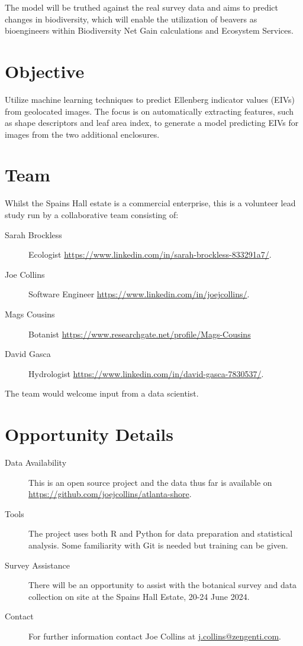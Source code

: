 \documentclass{./roles}
\begin{document}
The model will be truthed against the real survey data and aims to predict changes in biodiversity,
which will enable the utilization of beavers as bioengineers within Biodiversity Net Gain calculations and Ecosystem Services. 

\section*{Objective}

Utilize machine learning techniques to predict Ellenberg indicator values (EIVs)
from geolocated images.
The focus is on automatically extracting features,
such as shape descriptors and leaf area index,
to generate a model predicting EIVs for images from the two additional enclosures.

\section*{Team}

Whilst the Spains Hall estate is a commercial enterprise,
this is a volunteer lead study
run by a collaborative team consisting of:

\begin{description}
    \item[Sarah Brockless] Ecologist \href{https://www.linkedin.com/in/sarah-brockless-833291a7/}{https://www.linkedin.com/in/sarah-brockless-833291a7/}.
    \item[Joe Collins] Software Engineer \href{https://www.linkedin.com/in/joejcollins/}{https://www.linkedin.com/in/joejcollins/}.
    \item[Mags Cousins] Botanist \href{https://www.researchgate.net/profile/Mags-Cousins}{https://www.researchgate.net/profile/Mags-Cousins}
    \item[David Gasca] Hydrologist \href{https://www.linkedin.com/in/david-gasca-7830537/}{https://www.linkedin.com/in/david-gasca-7830537/}.
\end{description}

The team would welcome input from a data scientist.

\section*{Opportunity Details}

\begin{description}
    \item[Data Availability] This is an open source project and
        the data thus far is available on \href{https://github.com/joejcollins/atlanta-shore}{https://github.com/joejcollins/atlanta-shore}.
    \item[Tools] The project uses both R and Python for data preparation and statistical analysis.
        Some familiarity with Git is needed but training can be given.
    \item[Survey Assistance] There will be an opportunity to assist with the botanical survey
        and data collection on site at the Spains Hall Estate, 20-24 June 2024.
    \item[Contact] For further information contact Joe Collins at \href{mailto:j.collins@zengenti.com}{j.collins@zengenti.com}.
\end{description}
\end{document}
